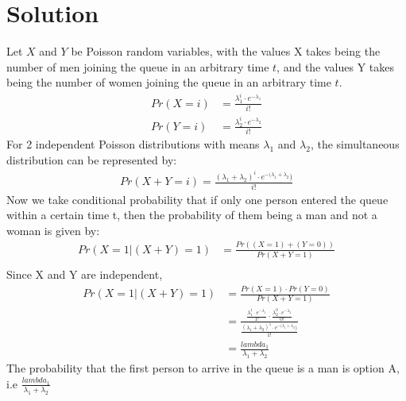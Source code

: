 \documentclass[twocolumn]{article}
\providecommand{\brak}[1]{\ensuremath{\left(#1\right)}}
\theoremstyle{remark}
\numberwithin{equation}{subsection}
\begin{document}
\section{Solution}
Let $X$ and $Y$ be Poisson random variables, with the values X takes being the number of men joining the queue in an arbitrary time $t$, and the values Y takes being the number of women joining the queue in an arbitrary time $t$.
\begin{align}
    Pr\brak{X=i}&=\frac{\lambda_1^i\cdot e^{-\lambda_1}}{i!}\\
    Pr\brak{Y=i}&=\frac{\lambda_2^i\cdot e^{-\lambda_2}}{i!}
\end{align}
For 2 independent Poisson distributions with means $\lambda_1$ and $\lambda_2$, the simultaneous distribution can be represented by:
\begin{align}
    Pr\brak{X+Y=i}=\frac{(\lambda_1+\lambda_2)^i\cdot e^{-(\lambda_1+\lambda_2})}{i!}
\end{align}
Now we take conditional probability that if only one person entered the queue within a certain time t, then the probability of them being a man and not a woman is given by:
\begin{align}
    Pr\brak{X=1|(X+Y)=1}&=\frac{Pr\brak{(X=1) + (Y=0)}}{Pr\brak{X+Y=1}}\\
\end{align}
Since X and Y are independent, 
\begin{align}
    Pr\brak{X=1|(X+Y)=1}&=\frac{Pr\brak{X=1}\cdot Pr\brak{Y=0}}{Pr\brak{X+Y=1}}\\
    &=\frac{\frac{\lambda_1^1\cdot e^{-\lambda_1}}{1!}\cdot \frac{\lambda_2^0\cdot e^{-\lambda_2}}{0!}}{\frac{(\lambda_1+\lambda_2)^1\cdot e^{-(\lambda_1+\lambda_2})}{1!}}\\
    &=\frac{lambda_1}{\lambda_1+\lambda_2}
\end{align}
 The probability that the first person to arrive in the queue is a man is option A, i.e $\frac{lambda_1}{\lambda_1+\lambda_2}$
\end{document}
